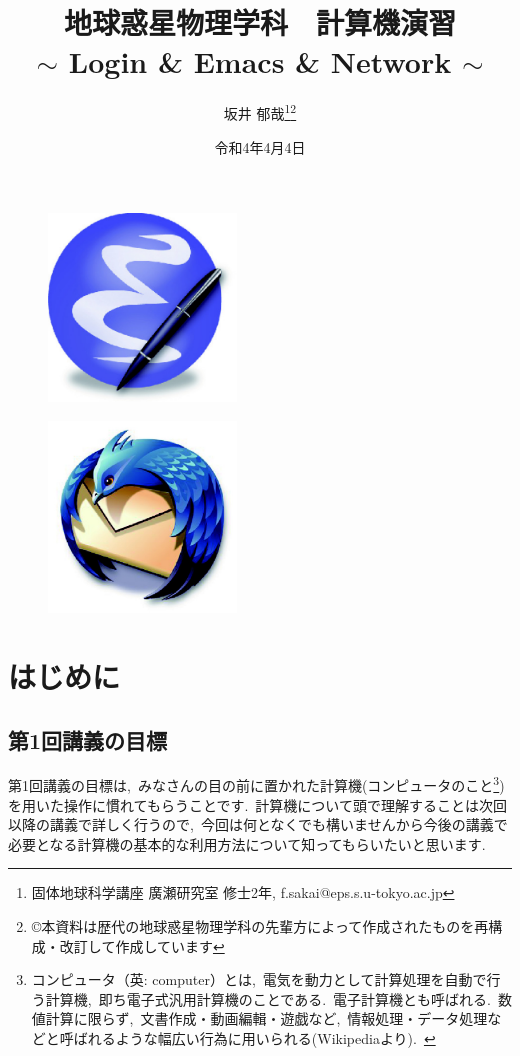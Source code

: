 \documentclass{jarticle}
\title{\bf{地球惑星物理学科　計算機演習}\\
$\sim$ Login \& Emacs \& Network $\sim$}
\author{坂井 郁哉\footnote{固体地球科学講座 廣瀬研究室 修士2年, f.sakai@eps.s.u-tokyo.ac.jp}\footnote{\copyright 本資料は歴代の地球惑星物理学科の先輩方によって作成されたものを再構成・改訂して作成しています}}
\date{令和4年4月4日}
\begin{document}
\maketitle

\begin{figure}[h]
 \begin{minipage}{0.5\hsize}
  \begin{center}
   \includegraphics[width=50mm,pagebox=cropbox,clip]{fig/emacs.pdf}
  \end{center}
  \label{fig:one}
 \end{minipage}
 \begin{minipage}{0.5\hsize}
  \begin{center}
   \includegraphics[width=50mm,pagebox=cropbox,clip]{fig/mozilla-thunderbird.pdf}
  \end{center}
  \label{fig:two}
 \end{minipage}
\end{figure}

\tableofcontents

\addtocounter{section}{-1}

\section{はじめに}
\subsection{第1回講義の目標}
第1回講義の目標は,\ みなさんの目の前に置かれた計算機(コンピュータのこと\footnote{コンピュータ（英: computer）とは,\ 電気を動力として計算処理を自動で行う計算機,\ 即ち電子式汎用計算機のことである.\  電子計算機とも呼ばれる.\  数値計算に限らず,\ 文書作成・動画編輯・遊戯など,\ 情報処理・データ処理などと呼ばれるような幅広い行為に用いられる(Wikipediaより).\ })を用いた操作に慣れてもらうことです.\ 計算機について頭で理解することは次回以降の講義で詳しく行うので,\ 今回は何となくでも構いませんから今後の講義で必要となる計算機の基本的な利用方法について知ってもらいたいと思います.
\end{document}
